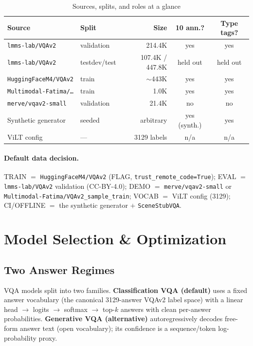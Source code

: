 \documentclass[12pt,a4paper]{article}
\begin{document}
\begin{table}[H]
\centering
\caption{Sources, splits, and roles at a glance}
\small
\begin{tabular}{llrcc}
\toprule
\textbf{Source} & \textbf{Split} & \textbf{Size} & \textbf{10 ann.?} & \textbf{Type tags?} \\
\midrule
\texttt{lmms-lab/VQAv2} & validation & 214.4K & yes & yes \\
\texttt{lmms-lab/VQAv2} & testdev/test & 107.4K / 447.8K & held out & held out \\
\texttt{HuggingFaceM4/VQAv2} & train & $\sim$443K & yes & yes \\
\texttt{Multimodal-Fatima/\dots} & train & 1.0K & yes & yes \\
\texttt{merve/vqav2-small} & validation & 21.4K & no & no \\
Synthetic generator & seeded & arbitrary & yes (synth.) & yes \\
ViLT config & --- & 3129 labels & n/a & n/a \\
\bottomrule
\end{tabular}
\end{table}

\paragraph{Default data decision.} TRAIN $=$ \texttt{HuggingFaceM4/VQAv2} (FLAG, \texttt{trust\_remote\_code=True}); EVAL $=$ \texttt{lmms-lab/VQAv2} validation (CC-BY-4.0); DEMO $=$ \texttt{merve/vqav2-small} or \texttt{Multimodal-Fatima/VQAv2\_sample\_train}; VOCAB $=$ ViLT config (3129); CI/OFFLINE $=$ the synthetic generator $+$ \texttt{SceneStubVQA}.

\section{Model Selection \& Optimization}

\subsection{Two Answer Regimes}

VQA models split into two families. \textbf{Classification VQA (default)} uses a fixed answer vocabulary (the canonical 3129-answer VQAv2 label space) with a linear head $\rightarrow$ logits $\rightarrow$ softmax $\rightarrow$ top-$k$ answers with clean per-answer probabilities. \textbf{Generative VQA (alternative)} autoregressively decodes free-form answer text (open vocabulary); its confidence is a sequence/token log-probability proxy.
\end{document}

